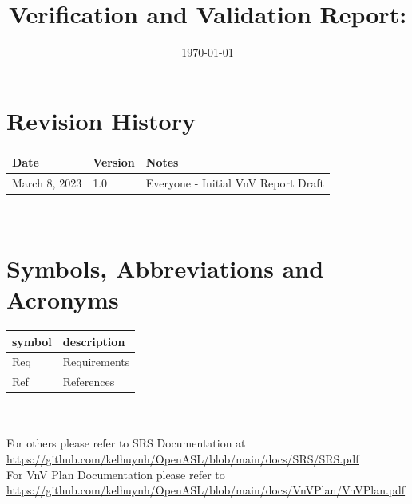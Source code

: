 \documentclass[12pt, titlepage]{article}
\begin{document}
\title{Verification and Validation Report: \progname} 
\author{\authname}
\date{\today}
	
\maketitle


\section{Revision History}

\begin{tabularx}{\textwidth}{p{3cm}p{2cm}X}
\toprule {\bf Date} & {\bf Version} & {\bf Notes}\\
\midrule
March 8, 2023 & 1.0 & Everyone - Initial VnV Report Draft\\
\bottomrule
\end{tabularx}

~\newpage

\section{Symbols, Abbreviations and Acronyms}

\renewcommand{\arraystretch}{1.2}
\begin{tabular}{l l} 
  \toprule		
  \textbf{symbol} & \textbf{description}\\
  \midrule 
  Req & Requirements\\
  Ref & References \\
  \bottomrule
\end{tabular}\\
~\\
For others please refer to SRS Documentation at \url{https://github.com/kelhuynh/OpenASL/blob/main/docs/SRS/SRS.pdf}\\
For VnV Plan Documentation please refer to \url{https://github.com/kelhuynh/OpenASL/blob/main/docs/VnVPlan/VnVPlan.pdf}
\end{document}

